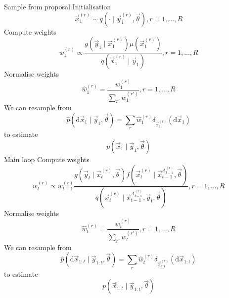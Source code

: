     \begin{algorithmbis}\label{alg:sis}
        \begin{algorithmic}[1]
            \State Sample from proposal \Comment Initialisation
                \begin{equation}
                    \vec x_1^{(r)} \sim q\left(\cdot \mid \vec y_1^{(r)}, \vec \theta\right), r = 1, \dotsc, R
                \end{equation}
            \State Compute weights
                \begin{equation}
                    w_1^{(r)} \propto \frac{g\left(\vec y_1 \mid \vec x^{(r)}_1\right) \mu\left(\vec x^{(r)}_1\right)}{q\left(\vec x_1^{(r)} \mid \vec y_1\right)}, r = 1, \dotsc, R
                \end{equation}
            \State Normalise weights
                \begin{equation}
                    \hat w_1^{(r)} = \frac{w_1^{(r)}}{\sum_{r'} w_1^{(r')}}, r = 1, \dotsc, R
                \end{equation}
            \State We can resample from 
                \begin{equation}
                    \hat p(\mathrm d \vec x_1 \mid \vec y_1, \vec \theta) = \sum_r \hat w_1^{(r)} \delta_{\vec x_1^{(r)}}(\mathrm d\vec x_1)
                \end{equation}
                to estimate
                \begin{equation}
                    p(\vec x_1 \mid \vec y_1, \vec \theta)
                \end{equation}
             \Comment Main loop
                \State Compute weights
                    \begin{equation}
                        w_t^{(r)} \propto w_{t - 1}^{(r)} \frac{g\left(\vec y_t \mid \vec x_t^{(r)}, \vec \theta\right) f\left(\vec x_t^{(r)} \mid \vec x_{t - 1}^{A_{t - 1}^{(r)}}, \vec \theta \right)}{q\left(\vec x_t^{(r)} \mid \vec x_{t - 1}^{A_{t - 1}^{(r)}}, \vec y_t, \vec \theta \right)}, r = 1, \dotsc, R
                    \end{equation}
                \State Normalise weights
                    \begin{equation}
                        \hat w_t^{(r)} = \frac{w_t^{(r)}}{\sum_{r'} w_t^{(r')}}, r = 1, \dotsc, R
                    \end{equation}
                \State We can resample from
                    \begin{equation}
                        \hat p(\mathrm d \vec x_{1:t} \mid \vec y_{1:t}, \vec \theta) = \sum_r \hat w_t^{(r)} \delta_{\vec x_{1:t}^{(r)}}(\mathrm d \vec x_{1:t})
                    \end{equation}
                    to estimate
                    \begin{equation}
                        p(\vec x_{1:t} \mid \vec y_{1:t}, \vec \theta)
                    \end{equation}
            \EndFor
        \end{algorithmic}
    \end{algorithmbis}
